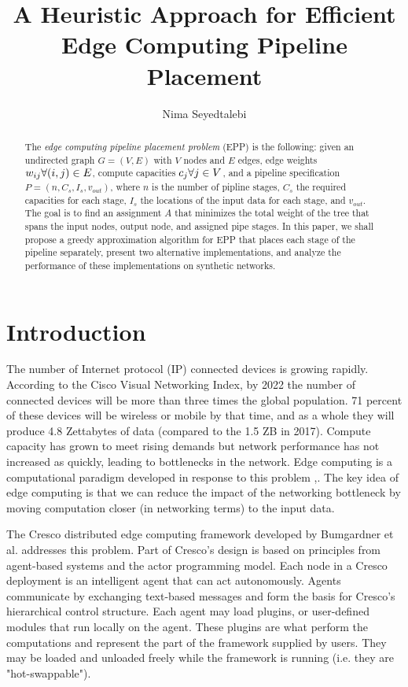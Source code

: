 \documentclass{article}
\author{Nima Seyedtalebi}
\title{A Heuristic Approach for Efficient Edge Computing Pipeline Placement}
\newcommand{\forallv}[1]{\ensuremath{\forall #1 \in V}}
\newcommand{\foralle}[2]{\ensuremath{\forall (#1,#2) \in E }}
\begin{document}
	\maketitle
	\begin{abstract}
		The \textit{edge computing pipeline placement problem} (EPP) is the following: given an undirected graph $G=(V,E)$ with $V$ nodes and $E$ edges, edge weights $w_{ij} \space \foralle{i}{j}$, compute capacities $c_{j} \space \forallv{j}$, and a pipeline specification $P = (n,C_{s},I_{s},v_{out})$, where  $n$ is the number of pipline stages, $C_{s}$ the required capacities for each stage, $I_{s}$ the locations of the input data for each stage, and $v_{out}$. The goal is to find an assignment $A$ that minimizes the total weight of the tree that spans the input nodes, output node, and assigned pipe stages. In this paper, we shall propose a greedy approximation algorithm for EPP that places each stage of the pipeline separately, present two alternative implementations, and analyze the performance of these implementations on synthetic networks.
	\end{abstract}
	
	\section{Introduction}
	The number of Internet protocol (IP) connected devices is growing rapidly. According to the Cisco Visual Networking Index, by 2022 the number of connected devices will be more than three times the global population. 71 percent of these devices will be wireless or mobile by that time, and as a whole they will produce 4.8 Zettabytes of data (compared to the 1.5 ZB in 2017).\cite{ciscoVNI} Compute capacity has grown to meet rising demands but network performance has not increased as quickly, leading to bottlenecks in the network. Edge computing is a computational paradigm developed in response to this problem \cite{edgeEmerge},\cite{edgePromise}. The key idea of edge computing is that we can reduce the impact of the networking bottleneck by moving computation closer (in networking terms) to the input data.
	
	The Cresco distributed edge computing framework developed by Bumgardner et al.\cite{bumgardner2016cresco} addresses this problem. Part of Cresco's design is based on principles from agent-based systems and the actor programming model. Each node in a Cresco deployment is an intelligent agent that can act autonomously. Agents communicate by exchanging text-based messages and form the basis for Cresco's hierarchical control structure. Each agent may load plugins, or user-defined modules that run locally on the agent. These plugins are what perform the computations and represent the part of the framework supplied by users. They may be loaded and unloaded freely while the framework is running (i.e. they are "hot-swappable").
	
\end{document}
